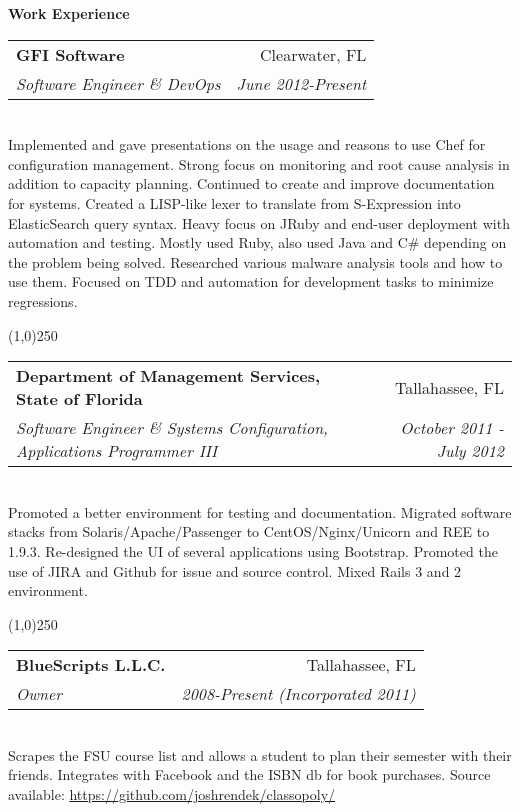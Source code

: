 \documentclass[letterpaper,11pt]{article}
\makeatletter
\newcommand{\resheading}[1]{{\large \colorbox{myblue}{\begin{minipage}{\textwidth}{\textbf{#1 \vphantom{p\^{E}}}}\end{minipage}}}}
\newcommand{\ressubheading}[4]{
\begin{tabular*}{7.0in}{l@{\extracolsep{\fill}}r}
		\textbf{#1} & #2 \\
		\textit{#3} & \textit{#4} \\
\end{tabular*}\vspace{-6pt}}
\makeatother
\begin{document}
\resheading{Work Experience}

\ressubheading{GFI Software}{Clearwater, FL}{Software Engineer \& DevOps}{June 2012-Present}

\hspace{5pt} \\
Implemented and gave presentations on the usage and reasons to use Chef for configuration management. Strong focus on monitoring and root cause analysis in addition to capacity planning. Continued to create and improve documentation for systems. Created a
LISP-like lexer to translate from S-Expression into ElasticSearch query syntax. Heavy focus on JRuby and end-user deployment with automation and testing. Mostly used Ruby, also used Java and C\#
depending on the problem being solved. Researched various malware analysis tools and how to use them. Focused on TDD and automation for development tasks to minimize regressions.

\begin{center}
  \line(1,0){250}
\end{center}


\ressubheading{Department of Management Services, State of Florida}{Tallahassee, FL}{Software Engineer \& Systems Configuration, Applications Programmer III}{October 2011 - July 2012}

\hspace{5pt} \\

Promoted a better environment for testing and documentation. Migrated software stacks from Solaris/Apache/Passenger to CentOS/Nginx/Unicorn and REE to 1.9.3.
Re-designed the UI of several applications using Bootstrap. Promoted the use of JIRA and Github for issue and source control. Mixed Rails 3 and 2 environment.

\begin{center}
  \line(1,0){250}
\end{center}

\pagebreak

\ressubheading{BlueScripts L.L.C.}{Tallahassee, FL}{Owner}{2008-Present (Incorporated 2011)}

\setlength{\parindent}{15pt}

\hspace{5pt} \\

Scrapes the FSU course list and allows a student to plan their semester with their friends. Integrates with Facebook and the ISBN db for book purchases. 
Source available: \url{https://github.com/joshrendek/classopoly/}
\end{document}

